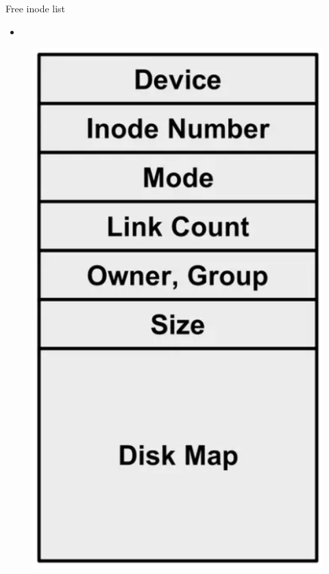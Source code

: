 \documentclass[xcolor=table]{beamer}
\begin{document}
    \begin{frame}[allowframebreaks]{Free inode list}
        \begin{itemize}
            \item
        \end{itemize}
        
        \framebreak
        
        \begin{figure}
            \centering
            \includegraphics[width=\textwidth,height=0.8\textheight,keepaspectratio]{images/inode1.png}
            \label{fig:inode1.png}
        \end{figure}
    \end{frame}
    
\end{document}
